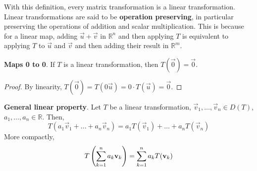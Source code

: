 \documentclass[letterpaper,12pt]{article}
\begin{document}
With this definition, every matrix transformation is a linear transformation. Linear transformations are said to be \textbf{operation preserving}, in particular preserving the operations of addition and scalar multiplication. This is because for a linear map, adding $\vec{u} + \vec{v}$ in $\mathbb{R}^n$ and then applying $T$ is equivalent to applying $T$ to $\vec{u}$ and $\vec{v}$ and then adding their result in $\mathbb{R}^m$.

\begin{theorem}
\textbf{Maps 0 to 0}. If $T$ is a linear transformation, then $T(\vec{0}) = \vec{0}$.
\end{theorem}
\begin{proof}
By linearity, $T(\vec{0}) = T(0\vec{u}) = 0 \cdot T(\vec{u}) = \vec{0}$.
\end{proof}

\begin{theorem}
\textbf{General linear property}. Let $T$ be a linear transformation, $\vec{v}_1, \dots, \vec{v}_n \in D(T)$, $a_1, \dots, a_n \in \mathbb{R}$. Then,
\begin{equation*}
    \boxed{T(a_1 \vec{v}_1 + \dots + a_n \vec{v}_n) = a_1 T(\vec{v}_1) + \dots + a_n T(\vec{v}_n)}
\end{equation*}
More compactly,
\begin{equation*}
    T\left( \sum_{k=1}^n a_k \mathbf{v}_k \right) = \sum_{k=1}^n a_k T(\mathbf{v}_k)
\end{equation*}
\end{theorem}
\end{document}
